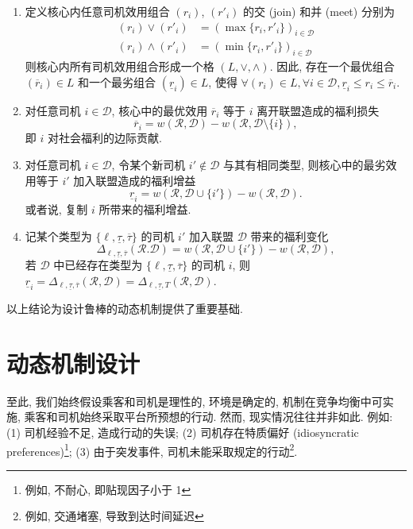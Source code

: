 \documentclass[10pt,twocolumn]{article}
\begin{document}
\begin{enumerate}[label=(\arabic*)]
  \item 定义核心内任意司机效用组合 $(r_i)$, $(r'_i)$ 的交 (join) 和并 (meet) 分别为
    $$
      \begin{aligned}
        (r_i)\vee(r'_i)   & = (\max\{r_i, r'_i\})_{i\in \mathcal{D}} \\
        (r_i)\wedge(r'_i) & = (\min\{r_i, r'_i\})_{i\in \mathcal{D}}
      \end{aligned}
    $$
    则核心内所有司机效用组合形成一个格 $(L, \vee, \wedge)$. 因此, 存在一个最优组合 $(\overline{r}_i)\in L$ 和一个最劣组合 $(\underline{r}_i)\in L$, 使得 $\forall (r_i)\in L, \forall i\in \mathcal{D}, \underline{r}_i \le r_i \le \overline{r}_i$.

  \item 对任意司机 $i\in \mathcal{D}$, 核心中的最优效用 $\overline{r}_i$ 等于 $i$ 离开联盟造成的福利损失
    $$\overline{r}_i = w(\mathcal{R}, \mathcal{D}) - w(\mathcal{R}, \mathcal{D}\setminus\{i\}),$$
    即 $i$ 对社会福利的边际贡献.

  \item 对任意司机 $i\in \mathcal{D}$, 令某个新司机 $i'\not\in\mathcal{D}$ 与其有相同类型, 则核心中的最劣效用等于 $i'$ 加入联盟造成的福利增益
    $$\underline{r}_i = w(\mathcal{R}, \mathcal{D}\cup\{i'\}) - w(\mathcal{R}, \mathcal{D}).$$
    或者说, 复制 $i$ 所带来的福利增益.

  \item 记某个类型为 $\{\ell, \underline{\tau}, \overline{\tau}\}$ 的司机 $i'$ 加入联盟 $\mathcal{D}$ 带来的福利变化
    $$
      \Delta_{\ell, \underline{\tau}, \overline{\tau}}(\mathcal{R}. \mathcal{D}) = w(\mathcal{R}, \mathcal{D}\cup\{i'\}) - w(\mathcal{R}, \mathcal{D}),
    $$
    若 $\mathcal{D}$ 中已经存在类型为 $\{\ell, \underline{\tau}, \overline{\tau}\}$ 的司机 $i$, 则 $\underline{r}_i = \Delta_{\ell, \underline{\tau}, \overline{\tau}}(\mathcal{R},\mathcal{D}) = \Delta_{\ell, \underline{\tau}, T}(\mathcal{R},\mathcal{D})$.
\end{enumerate}

以上结论为设计鲁棒的动态机制提供了重要基础.

\section{动态机制设计}

至此, 我们始终假设乘客和司机是理性的, 环境是确定的, 机制在竞争均衡中可实施, 乘客和司机始终采取平台所预想的行动. 然而, 现实情况往往并非如此. 例如: (1) 司机经验不足, 造成行动的失误; (2) 司机存在特质偏好 (idiosyncratic preferences)\footnote{例如, 不耐心, 即贴现因子小于 1}; (3) 由于突发事件, 司机未能采取规定的行动\footnote{例如, 交通堵塞, 导致到达时间延迟}.
\end{document}
